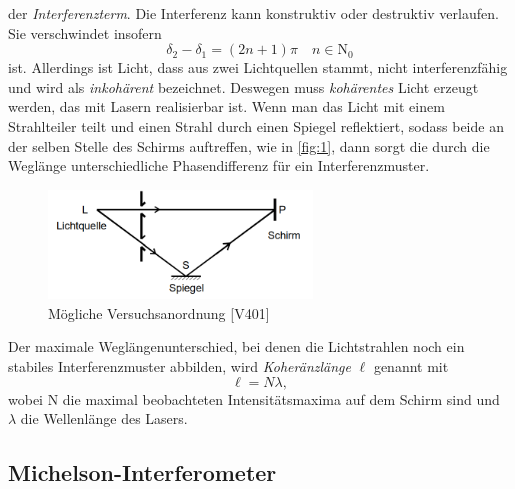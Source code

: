 der \textit{Interferenzterm}.
Die Interferenz kann konstruktiv oder destruktiv verlaufen. Sie verschwindet insofern 
\begin{equation}
  \delta_2 - \delta_1 = (2n+1)\pi \quad n \in \mathrm{N_{0}} \nonumber
\end{equation}
ist. Allerdings ist Licht, dass aus zwei Lichtquellen stammt, nicht interferenzfähig und wird als \textit{inkohärent} bezeichnet. Deswegen muss \textit{kohärentes} Licht erzeugt werden, das mit Lasern realisierbar ist.
Wenn man das Licht mit einem Strahlteiler teilt und einen Strahl durch einen Spiegel reflektiert, sodass beide an der selben Stelle des Schirms auftreffen, wie in \autoref{fig:1}, dann sorgt die durch die Weglänge unterschiedliche Phasendifferenz für ein Interferenzmuster.
\begin{figure}[H]
  \centering
  \includegraphics[width=7cm]{1}
  \caption{Mögliche Versuchsanordnung [V401]}
  \label{fig:1}
\end{figure}
Der maximale Weglängenunterschied, bei denen die Lichtstrahlen noch ein stabiles Interferenzmuster abbilden, wird \textit{Koheränzlänge} $\ell$ genannt mit
\begin{equation}
  \ell=N\lambda, \nonumber
\end{equation}
wobei N die maximal beobachteten Intensitätsmaxima auf dem Schirm sind und $\lambda$ die Wellenlänge des Lasers.

\subsection{Michelson-Interferometer}

